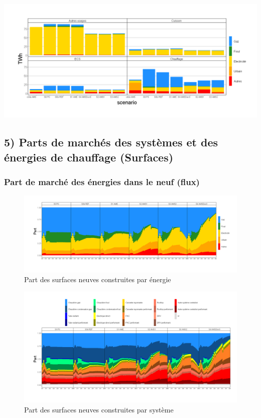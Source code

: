 \documentclass[]{article}
\begin{document}
\includegraphics{Exemple_sortiestertiaire_files/figure-latex/comp_cible_AMS_energie_chauffage-1.png}

\clearpage
\pagebreak

\subsection{5) Parts de marchés des systèmes et des énergies de
chauffage
(Surfaces)}\label{parts-de-marches-des-systemes-et-des-energies-de-chauffage-surfaces}

\subsubsection{Part de marché des énergies dans le neuf
(flux)}\label{part-de-marche-des-energies-dans-le-neuf-flux}

\begin{figure}
\centering
\includegraphics{Exemple_sortiestertiaire_files/figure-latex/Evol_PM_energie_neuf-1.png}
\caption{Part des surfaces neuves construites par énergie}
\end{figure}

\begin{figure}
\centering
\includegraphics{Exemple_sortiestertiaire_files/figure-latex/Evol_PM_syst_neuf-1.png}
\caption{Part des surfaces neuves construites par système}
\end{figure}
\end{document}
